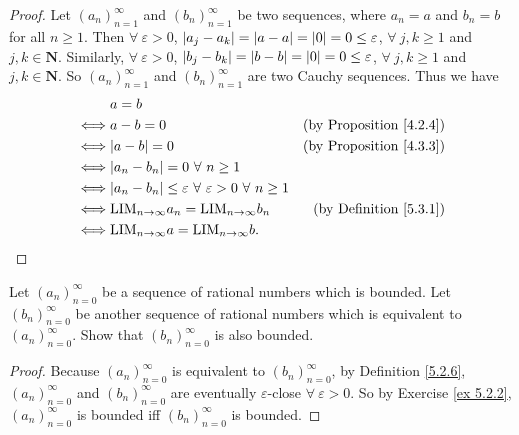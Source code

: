 \begin{proof}
    Let \((a_n)_{n = 1}^{\infty}\) and \((b_n)_{n = 1}^{\infty}\) be two sequences, where \(a_n = a\) and \(b_n = b\) for all \(n \geq 1\).
    Then \(\forall\ \varepsilon > 0\), \(\abs*{a_j - a_k} = \abs*{a - a} = \abs*{0} = 0 \leq \varepsilon\), \(\forall\ j, k \geq 1\) and \(j, k \in \mathbf{N}\).
    Similarly, \(\forall\ \varepsilon > 0\), \(\abs*{b_j - b_k} = \abs*{b - b} = \abs*{0} = 0 \leq \varepsilon\), \(\forall\ j, k \geq 1\) and \(j, k \in \mathbf{N}\).
    So \((a_n)_{n = 1}^{\infty}\) and \((b_n)_{n = 1}^{\infty}\) are two Cauchy sequences.
    Thus we have
    \begin{align*}
             & a = b                                                                                                                  \\
        \iff & a - b = 0                                                                        & \text{(by Proposition \ref{4.2.4})} \\
        \iff & \abs*{a - b} = 0                                                                 & \text{(by Proposition \ref{4.3.3})} \\
        \iff & \abs*{a_n - b_n} = 0 \ \forall\ n \geq 1                                                                               \\
        \iff & \abs*{a_n - b_n} \leq \varepsilon \ \forall\ \varepsilon > 0 \ \forall\ n \geq 1                                       \\
        \iff & \text{LIM}_{n \to \infty} a_n = \text{LIM}_{n \to \infty} b_n                    & \text{(by Definition \ref{5.3.1})}  \\
        \iff & \text{LIM}_{n \to \infty} a = \text{LIM}_{n \to \infty} b.
    \end{align*}
\end{proof}

\begin{exercise}\label{ex 5.3.4}
    Let \((a_n)_{n = 0}^{\infty}\) be a sequence of rational numbers which is bounded.
    Let \((b_n)_{n = 0}^{\infty}\) be another sequence of rational numbers which is equivalent to \((a_n)_{n = 0}^{\infty}\).
    Show that \((b_n)_{n = 0}^{\infty}\) is also bounded.
\end{exercise}

\begin{proof}
    Because \((a_n)_{n = 0}^{\infty}\) is equivalent to \((b_n)_{n = 0}^{\infty}\), by Definition \ref{5.2.6}, \((a_n)_{n = 0}^{\infty}\) and \((b_n)_{n = 0}^{\infty}\) are eventually \(\varepsilon\)-close \(\forall\ \varepsilon > 0\).
    So by Exercise \ref{ex 5.2.2}, \((a_n)_{n = 0}^{\infty}\) is bounded iff \((b_n)_{n = 0}^{\infty}\) is bounded.
\end{proof}

